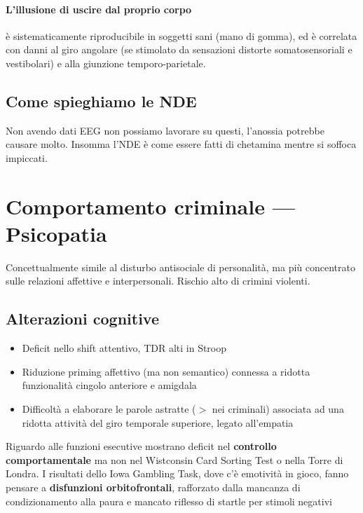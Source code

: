 \documentclass[12pt, a4paper]{article}
\begin{document}
\paragraph{L'illusione di uscire dal proprio corpo} è sistematicamente riproducibile in soggetti sani (mano di gomma), ed è correlata con danni al giro angolare (se stimolato da sensazioni distorte somatosensoriali e vestibolari) e alla giunzione temporo-parietale.

\subsection{Come spieghiamo le NDE}

Non avendo dati EEG non possiamo lavorare su questi, l'anossia potrebbe causare molto. Insomma l'NDE è come essere fatti di chetamina mentre si soffoca impiccati.

\section{Comportamento criminale --- Psicopatia}


Concettualmente simile al disturbo antisociale di personalità, ma più concentrato sulle relazioni affettive e interpersonali.
Rischio alto di crimini violenti.

\subsection{Alterazioni cognitive} 

\begin{itemize}
    \item Deficit nello shift attentivo, TDR alti in Stroop
    \item Riduzione priming affettivo (ma non semantico) connessa a ridotta funzionalità cingolo anteriore e amigdala
    \item Difficoltà a elaborare le parole astratte ($>$ nei criminali) associata ad una ridotta attività del giro temporale superiore, legato all'empatia
\end{itemize}

Riguardo alle funzioni esecutive mostrano deficit nel \textbf{controllo comportamentale} ma non nel Wistconsin Card Sorting Test o nella Torre di Londra. 
I risultati dello Iowa Gambling Task, dove c'è emotività in gioco, fanno pensare a \textbf{disfunzioni orbitofrontali}, rafforzato dalla mancanza di condizionamento alla paura e mancato riflesso di startle per stimoli negativi
\end{document}
